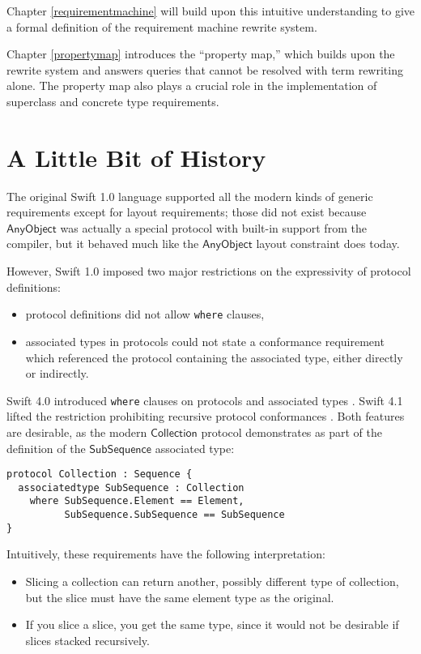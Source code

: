 \documentclass[a4paper,headsepline,bibliography=totoc,toc=flat,fleqn,twoside=semi]{scrbook}
\theoremstyle{definition}
\theoremstyle{definition}
\theoremstyle{definition}
\newcommand{\namesym}[1]{\mathsf{#1}}
\newcommand{\proto}[1]{\bm{\mathsf{#1}}}
\begin{document}
Chapter \ref{requirementmachine} will build upon this intuitive understanding to give a formal definition of the requirement machine rewrite system.

Chapter \ref{propertymap} introduces the ``property map,'' which builds upon the rewrite system and answers queries that cannot be resolved with term rewriting alone. The property map also plays a crucial role in the implementation of superclass and concrete type requirements.

\chapter{A Little Bit of History}\label{history}

The original Swift 1.0 language supported all the modern kinds of generic requirements except for layout requirements; those did not exist because $\proto{AnyObject}$ was actually a special protocol with built-in support from the compiler, but it behaved much like the $\proto{AnyObject}$ layout constraint does today.

However,  Swift 1.0 imposed two major restrictions on the expressivity of protocol definitions:
\begin{itemize}
\item protocol definitions did not allow \texttt{where} clauses,
\item associated types in protocols could not state a conformance requirement which referenced the protocol containing the associated type, either directly or indirectly.
\end{itemize}
Swift 4.0 introduced \texttt{where} clauses on protocols and associated types \cite{se0142}. Swift 4.1 lifted the restriction prohibiting recursive protocol conformances \cite{se0157}. Both features are desirable, as the modern $\proto{Collection}$ protocol demonstrates as part of the definition of the $\namesym{SubSequence}$ associated type:
\begin{Verbatim}
protocol Collection : Sequence {
  associatedtype SubSequence : Collection
    where SubSequence.Element == Element,
          SubSequence.SubSequence == SubSequence
}
\end{Verbatim}
Intuitively, these requirements have the following interpretation:
\begin{itemize}
\item Slicing a collection can return another, possibly different type of collection, but the slice must have the same element type as the original.
\item If you slice a slice, you get the same type, since it would not be desirable if slices stacked recursively.
\end{itemize}
\end{document}
